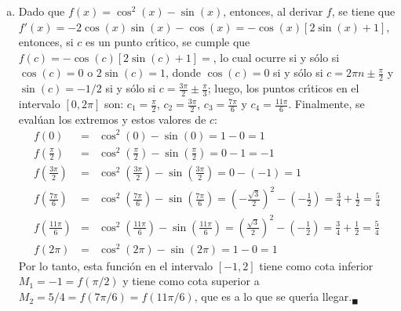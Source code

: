 \begin{solucion}
\begin{enumerate}[(a)]
  \item Dado que $f(x) = \cos^2(x) - \sin(x)$, entonces, al derivar $f$, se tiene que $f'(x) = -2\cos(x)\sin(x) - \cos(x) = -\cos(x)\left[ 2\sin(x) + 1 \right]$, entonces, si $c$ es un punto cr\'{\i}tico, se cumple que $f(c) = -\cos(c)\left[ 2\sin(c) + 1 \right] = $, lo cual ocurre si y s\'olo si $\cos(c) = 0$ o $2\sin(c) = 1$, donde $\cos(c) = 0$ si y s\'olo si $c = 2\pi n \pm \frac{\pi}{2}$ y $\sin(c) = -1/2$ si y s\'olo si $c = \frac{3\pi}{2} \pm \frac{\pi}{3}$; luego, los puntos cr\'{\i}ticos en el intervalo $[0,2\pi]$ son: $c_1 = \frac{\pi}{2}$, $c_2 = \frac{3\pi}{2}$, $c_3 = \frac{7\pi}{6}$ y $c_4 = \frac{11\pi}{6}$. Finalmente, se eval\'uan los extremos y estos valores de $c$:
  \begin{eqnarray*}
   f(0) & = & \cos^2(0) - \sin(0) = 1 - 0 = 1 \\
   f\left( \frac{\pi}{2} \right) & = & \cos^2 \left( \frac{\pi}{2} \right) - \sin\left( \frac{\pi}{2} \right) = 0 - 1 = -1 \\ 
   f\left( \frac{3\pi}{2} \right) & = & \cos^2 \left( \frac{3\pi}{2} \right) - \sin\left( \frac{3\pi}{2} \right) = 0 - (-1) = 1 \\ 
   f\left( \frac{7\pi}{6} \right) & = & \cos^2 \left( \frac{7\pi}{6} \right) - \sin\left( \frac{7\pi}{6} \right) = \left( -\frac{ \sqrt{3} }{2} \right)^2 - \left( -\frac{1}{2} \right) = \frac{3}{4} + \frac{1}{2} = \frac{5}{4} \\ 
   f\left( \frac{11\pi}{6} \right) & = & \cos^2 \left( \frac{11\pi}{6} \right) - \sin\left( \frac{11\pi}{6} \right) = \left( \frac{ \sqrt{3} }{2} \right)^2 - \left( -\frac{1}{2} \right) = \frac{3}{4} + \frac{1}{2} = \frac{5}{4} \\ 
   f(2\pi) & = & \cos^2(2\pi) - \sin(2\pi) = 1 - 0 = 1
  \end{eqnarray*}
  Por lo tanto, esta funci\'on en el intervalo $[-1,2]$ tiene como cota inferior $M_1 = -1 = f(\pi/2)$ y tiene como cota superior a $M_2 = 5/4 = f(7\pi/6) = f(11\pi/6)$, que es a lo que se quer\'{\i}a llegar.${}_{\blacksquare}$

 \end{enumerate}
\end{solucion}


